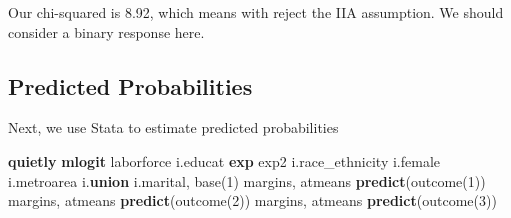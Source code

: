 \documentclass[
]{book}
\newenvironment{Shaded}{\begin{snugshade}}{\end{snugshade}}
\newcommand{\FunctionTok}[1]{\textcolor[rgb]{0.13,0.29,0.53}{\textbf{#1}}}
\newcommand{\KeywordTok}[1]{\textcolor[rgb]{0.13,0.29,0.53}{\textbf{#1}}}
\newcommand{\NormalTok}[1]{#1}
\begin{document}
Our chi-squared is 8.92, which means with reject the IIA assumption. We should consider a binary response here.

\subsection{Predicted Probabilities}\label{predicted-probabilities}

Next, we use Stata to estimate predicted probabilities

\begin{Shaded}
\begin{Highlighting}[]
\KeywordTok{quietly} \KeywordTok{mlogit}\NormalTok{ laborforce i.educat }\FunctionTok{exp}\NormalTok{ exp2 i.race\_ethnicity i.female i.metroarea i.}\KeywordTok{union}\NormalTok{ i.marital, base(1)}
\NormalTok{margins, atmeans }\KeywordTok{predict}\NormalTok{(outcome(1))}
\NormalTok{margins, atmeans }\KeywordTok{predict}\NormalTok{(outcome(2))}
\NormalTok{margins, atmeans }\KeywordTok{predict}\NormalTok{(outcome(3))}
\end{Highlighting}
\end{Shaded}
\end{document}
